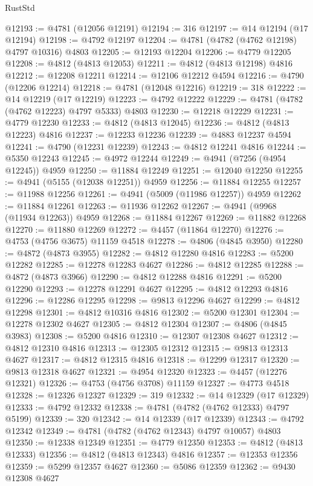 \begin{lexlean}{RustStd}
\begin{coremodule}
@12193 := @4781 (@12056 @12191)
@12194 := 316
@12197 := @14 @12194 (@17 @12194)
@12198 := @4792 @12197
@12204 := @4781 (@4782 (@4762 @12198) @4797 @10316) @4803
@12205 := @12193 @12204
@12206 := @4779 @12205
@12208 := @4812 (@4813 @12053)
@12211 := @4812 (@4813 @12198) @4816
@12212 := @12208 @12211
@12214 := @12106 @12212 @4594
@12216 := @4790 (@12206 @12214)
@12218 := @4781 (@12048 @12216)
@12219 := 318
@12222 := @14 @12219 (@17 @12219)
@12223 := @4792 @12222
@12229 := @4781 (@4782 (@4762 @12223) @4797 @5333) @4803
@12230 := @12218 @12229
@12231 := @4779 @12230
@12233 := @4812 (@4813 @12045)
@12236 := @4812 (@4813 @12223) @4816
@12237 := @12233 @12236
@12239 := @4883 @12237 @4594
@12241 := @4790 (@12231 @12239)
@12243 := @4812 @12241 @4816
@12244 := @5350 @12243
@12245 := @4972 @12244
@12249 := @4941 (@7256 (@4954 @12245)) @4959
@12250 := @11884 @12249
@12251 := @12040 @12250
@12255 := @4941 (@5155 (@12038 @12251)) @4959
@12256 := @11884 @12255
@12257 := @11988 @12256
@12261 := @4941 (@5009 (@11986 @12257)) @4959
@12262 := @11884 @12261
@12263 := @11936 @12262
@12267 := @4941 (@9968 (@11934 @12263)) @4959
@12268 := @11884 @12267
@12269 := @11882 @12268
@12270 := @11880 @12269
@12272 := @4457 (@11864 @12270)
@12276 := @4753 (@4756 @3675) @11159 @4518
@12278 := @4806 (@4845 @3950)
@12280 := @4872 (@4873 @3955)
@12282 := @4812 @12280 @4816
@12283 := @5200 @12282
@12285 := @12278 @12283 @4627
@12286 := @4812 @12285
@12288 := @4872 (@4873 @3966)
@12290 := @4812 @12288 @4816
@12291 := @5200 @12290
@12293 := @12278 @12291 @4627
@12295 := @4812 @12293 @4816
@12296 := @12286 @12295
@12298 := @9813 @12296 @4627
@12299 := @4812 @12298
@12301 := @4812 @10316 @4816
@12302 := @5200 @12301
@12304 := @12278 @12302 @4627
@12305 := @4812 @12304
@12307 := @4806 (@4845 @3983)
@12308 := @5200 @4816
@12310 := @12307 @12308 @4627
@12312 := @4812 @12310 @4816
@12313 := @12305 @12312
@12315 := @9813 @12313 @4627
@12317 := @4812 @12315 @4816
@12318 := @12299 @12317
@12320 := @9813 @12318 @4627
@12321 := @4954 @12320
@12323 := @4457 (@12276 @12321)
@12326 := @4753 (@4756 @3708) @11159
@12327 := @4773 @4518
@12328 := @12326 @12327
@12329 := 319
@12332 := @14 @12329 (@17 @12329)
@12333 := @4792 @12332
@12338 := @4781 (@4782 (@4762 @12333) @4797 @5199)
@12339 := 320
@12342 := @14 @12339 (@17 @12339)
@12343 := @4792 @12342
@12349 := @4781 (@4782 (@4762 @12343) @4797 @10057) @4803
@12350 := @12338 @12349
@12351 := @4779 @12350
@12353 := @4812 (@4813 @12333)
@12356 := @4812 (@4813 @12343) @4816
@12357 := @12353 @12356
@12359 := @5299 @12357 @4627
@12360 := @5086 @12359
@12362 := @9430 @12308 @4627

\end{coremodule}
\end{lexlean}
